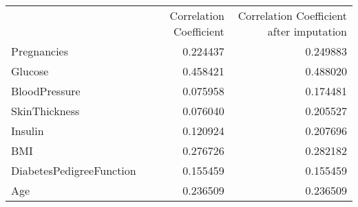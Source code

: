 \begin{tabular}{lrr}
 & Correlation Coefficient & Correlation Coefficient after imputation \\
Pregnancies & 0.224437 & 0.249883 \\
Glucose & 0.458421 & 0.488020 \\
BloodPressure & 0.075958 & 0.174481 \\
SkinThickness & 0.076040 & 0.205527 \\
Insulin & 0.120924 & 0.207696 \\
BMI & 0.276726 & 0.282182 \\
DiabetesPedigreeFunction & 0.155459 & 0.155459 \\
Age & 0.236509 & 0.236509 \\
\end{tabular}
